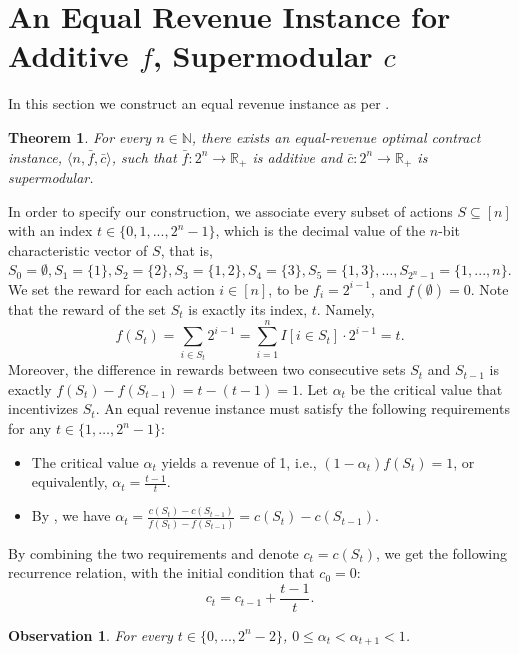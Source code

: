 \documentclass[11pt]{article}
\newtheorem{theorem}{Theorem}
\newtheorem{observation}{Observation}
\newcommand{\reals}{\mathbb{R}}
\newcommand{\feq}{\bar{f}}
\newcommand{\ceq}{\bar{c}}
\begin{document}
\section{An Equal Revenue Instance for Additive $f$, Supermodular $c$}\label{sec:eqRev_SupMod_c}

In this section we construct an equal revenue instance as per .
\begin{theorem}\label{thm:eqRev_SupMod_c}
For every $n \in \mathbb{N}$, there exists an equal-revenue optimal contract instance, $\langle n, \feq, \ceq \rangle$, such that $\feq:2^n \to \reals_+$ is additive and $\ceq:2^n \to \reals_+$ is supermodular.
\end{theorem}

In order to specify our construction, we associate every subset of actions $S \subseteq [n]$ with an index $t \in \{0,1,...,2^n-1\}$, which is the decimal value of the $n$-bit characteristic vector of $S$, that is, $S_0 = \emptyset, S_1=\{1\}, S_2=\{2\}, S_3=\{1,2\},S_4=
\{3\}, S_5=\{1,3\},\ldots,S_{2^n-1} = \{1,...,n\}$. 
We set the reward for each action $i \in [n]$, to be $f_i = 2^{i-1}$, and $f(\emptyset)=0$. Note that the reward of the set $S_t$ is exactly its index, $t$. Namely,
$$
f(S_t) = \sum_{i \in S_t} 2^{i-1} = \sum_{i=1}^{n} I[i\in S_t] \cdot 2^{i-1} = t.
$$
Moreover, the difference in rewards between two consecutive sets $S_t$ and $S_{t-1}$ is exactly $f(S_t) - f(S_{t-1}) = t - (t-1) = 1$.
Let $\alpha_t$ be the critical value that incentivizes $S_t$. 
An equal revenue instance must satisfy the following requirements for any $t \in \{1,\dots,2^n-1\}$:
\begin{itemize}
    \setlength\itemsep{-0.25em}
    \item The critical value $\alpha_t$ yields a revenue of 1, i.e., $(1-\alpha_t)f(S_t) = 1$, or 
    equivalently, $\alpha_{t} = \frac{t-1}{t}$.   
    \item By , we have $\alpha_{t} = \frac{c(S_{t})-c(S_{t-1})}{f(S_{t})-f(S_{t-1})}=c(S_{t})-c(S_{t-1})$. 
\end{itemize}
By combining the two requirements and denote $c_t=c(S_t)$, we get the following recurrence relation, with the initial condition that $c_0 = 0$:
\begin{equation}\label{eq:costs_RR}
c_{t} = c_{t-1} + \frac{t-1}{t}.
\end{equation}

\begin{observation}\label{obs:alphaMon_supermodular_c}
    For every $t \in \{0,...,2^n-2\}$, $0 \le \alpha_t < \alpha_{t+1} < 1$.
\end{observation}
\end{document}
